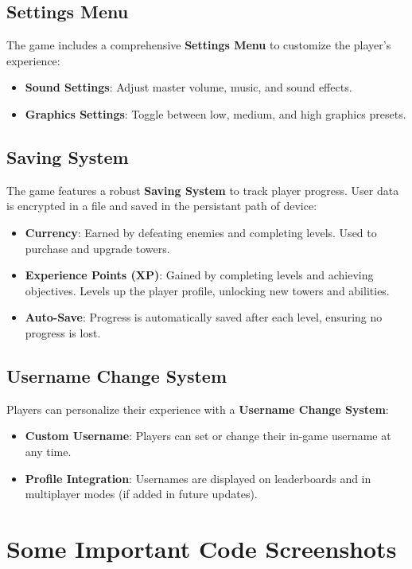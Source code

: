 \documentclass[12pt,a4paper]{report}
\begin{document}
\section{Settings Menu}  
The game includes a comprehensive \textbf{Settings Menu} to customize the player’s experience:  
\begin{itemize}
    \item \textbf{Sound Settings}: Adjust master volume, music, and sound effects.  
    \item \textbf{Graphics Settings}: Toggle between low, medium, and high graphics presets.  
\end{itemize}

\section{Saving System}  
The game features a robust \textbf{Saving System} to track player progress. User data is encrypted in a file and saved in the persistant path of device:  
\begin{itemize}
    \item \textbf{Currency}: Earned by defeating enemies and completing levels. Used to purchase and upgrade towers.  
    \item \textbf{Experience Points (XP)}: Gained by completing levels and achieving objectives. Levels up the player profile, unlocking new towers and abilities.  
    \item \textbf{Auto-Save}: Progress is automatically saved after each level, ensuring no progress is lost.  
\end{itemize}

\section{Username Change System}  
Players can personalize their experience with a \textbf{Username Change System}:  
\begin{itemize}
    \item \textbf{Custom Username}: Players can set or change their in-game username at any time.  
    \item \textbf{Profile Integration}: Usernames are displayed on leaderboards and in multiplayer modes (if added in future updates).  
\end{itemize}

\chapter{Some Important Code Screenshots}
\end{document}
